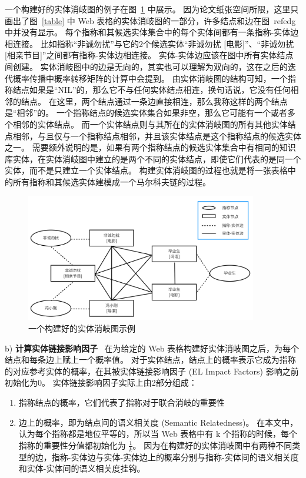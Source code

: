 一个构建好的实体消岐图的例子在图~\ref{edg} 中展示。
因为论文纸张空间所限，这里只画出了图~\ref{table} 中 Web 表格的实体消岐图的一部分，许多结点和边在图~ref{edg}中并没有显示。
每个指称和其候选实体集合中的每个实体间都有一条指称-实体边相连接。
比如指称``非诚勿扰''与它的2个候选实体``非诚勿扰 [电影]''、``非诚勿扰 [相亲节目]''之间都有指称-实体边相连接。
实体-实体边应该在图中所有实体结点间创建。
实体消岐图中的边是无向的，其实也可以理解为双向的，这在之后的迭代概率传播中概率转移矩阵的计算中会提到。
由实体消岐图的结构可知，一个指称结点如果是``NIL''的，那么它不与任何实体结点相连，换句话说，它没有任何相邻的结点。
在这里，两个结点通过一条边直接相连，那么我称这样的两个结点是``相邻''的。
一个指称结点的候选实体集合如果非空，那么它可能有一个或者多个相邻的实体结点。
而一个实体结点则与其所在的实体消岐图的所有其他实体结点相邻，与且仅与一个指称结点相邻，并且该实体结点是这个指称结点的候选实体之一。
需要额外说明的是，如果有两个指称结点的候选实体集合中有相同的知识库实体，在实体消岐图中建立的是两个不同的实体结点，即使它们代表的是同一个实体，而不是只建立一个实体结点。
构建实体消岐图的过程也就是将一张表格中的所有指称和其候选实体建模成一个马尔科夫链的过程。
\newline

\begin{figure}[htbp]
\centering
\includegraphics[width=0.9\textwidth]{img/edg}
\caption{一个构建好的实体消岐图示例}
\label{edg}
\end{figure}

b) \textbf{计算实体链接影响因子} \ 
在为给定的 Web 表格构建好实体消岐图之后，为每个结点和每条边上赋上一个概率值。
对于实体结点，结点上的概率表示它成为指称的对应参考实体的概率，在其被实体链接影响因子 (EL Impact Factors) 影响之前初始化为0。
实体链接影响因子实际上由2部分组成：
\begin{enumerate}[1)]
\item 指称结点的概率，它们代表了指称对于联合消岐的重要性
\item 边上的概率，即为结点间的语义相关度 (Semantic Relatedness)。
在本文中，认为每个指称都是地位平等的，所以当 Web 表格中有 k 个指称的时候，每个指称的重要性分值都初始化为 $\frac{1}{k}$。
因为在构建好的实体消岐图中有两种不同类型的边，指称-实体边与实体-实体边上的概率分别与指称-实体间的语义相关度和实体-实体间的语义相关度挂钩。
\end{enumerate}


